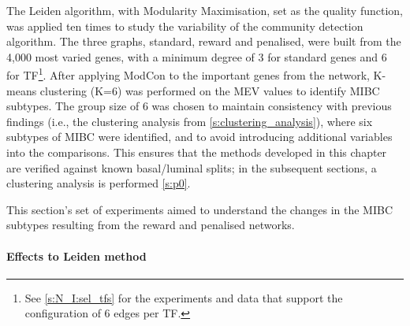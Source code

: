 The Leiden algorithm, with Modularity Maximisation, set as the quality function, was applied ten times to study the variability of the community detection algorithm. The three graphs, standard, reward and penalised, were built from the 4,000 most varied genes, with a minimum degree of 3 for standard genes and 6 for TF\footnote{See \cref{s:N_I:sel_tfs} for the experiments and data that support the configuration of 6 edges per TF.}. After applying ModCon to the important genes from the network, K-means clustering (K=6) was performed on the MEV values to identify MIBC subtypes. The group size of 6 was chosen to maintain consistency with previous findings (i.e., the clustering analysis from \cref{s:clustering_analysis}), where six subtypes of MIBC were identified, and to avoid introducing additional variables into the comparisons. This ensures that the methods developed in this chapter are verified against known basal/luminal splits; in the subsequent sections, a clustering analysis is performed \cref{s:p0}. 

This section's set of experiments aimed to understand the changes in the MIBC subtypes resulting from the reward and penalised networks.

\paragraph*{Effects to Leiden method}


